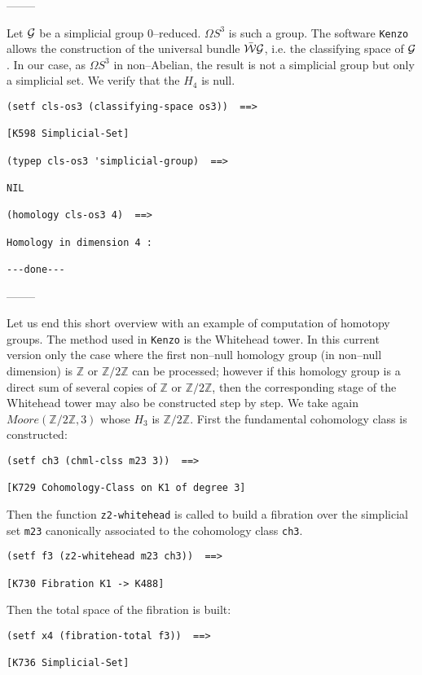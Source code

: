 \begin{center}
--------
\end{center}
Let ${\cal G}$ be a simplicial group $0$--reduced. $\Omega S^3$ is such a group.
The software  {\tt Kenzo} allows
the construction of the universal bundle $\bar{\cal W}{\cal G}$, i.e. the
classifying space of ${\cal G}$. In our case, as $\Omega S^3$ in non--Abelian, the
result is not a simplicial group but only a simplicial set. We verify that the $H_4$ is null.
{\footnotesize\begin{verbatim}
(setf cls-os3 (classifying-space os3))  ==>

[K598 Simplicial-Set]

(typep cls-os3 'simplicial-group)  ==>

NIL

(homology cls-os3 4)  ==>

Homology in dimension 4 :

---done---
\end{verbatim}}
\begin{center}
--------
\end{center}
\vskip 0.40cm
Let us end this short overview with an example of computation of homotopy groups.
The method used in {\tt Kenzo} is the Whitehead tower.
In this current version only the case where the first non--null
homology group (in non--null dimension) is $\mathbb{Z}$ or $\mathbb{Z}/{2 \mathbb{Z}}$ can be processed; however if this
homology group is a direct sum of several copies of $\mathbb{Z}$ or $\mathbb{Z}/{2 \mathbb{Z}}$, then the corresponding
stage of the Whitehead tower may also be constructed step by step.
\vskip 0.40cm
We take again $Moore(\mathbb{Z}/2\mathbb{Z}, 3)$ whose $H_3$ is $\mathbb{Z}/2\mathbb{Z}$. First the fundamental cohomology
class is constructed:
{\footnotesize\begin{verbatim}
(setf ch3 (chml-clss m23 3))  ==>

[K729 Cohomology-Class on K1 of degree 3]
\end{verbatim}}
Then the function {\tt z2-whitehead} is called to build a fibration over the simplicial set {\tt m23}
canonically associated to the cohomology class {\tt ch3}.
{\footnotesize\begin{verbatim}
(setf f3 (z2-whitehead m23 ch3))  ==>

[K730 Fibration K1 -> K488]
\end{verbatim}}
Then the total space of the fibration is built:
{\footnotesize\begin{verbatim}
(setf x4 (fibration-total f3))  ==>

[K736 Simplicial-Set]
\end{verbatim}}
